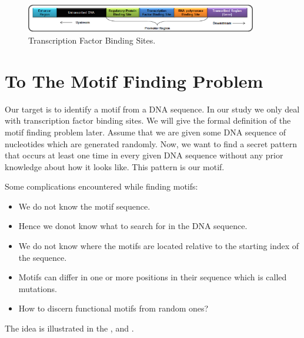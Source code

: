 \begin{figure}[!tb]
	\centering
	\includegraphics[width=0.9\textwidth]{figures/tfbs}
	\caption{Transcription Factor Binding Sites.}
	\label{fig:tfbs}
\end{figure}

\section{To The Motif Finding Problem}
Our target is to identify a motif from a DNA sequence. In our study
we only deal with transcription factor binding sites. We will give
the formal definition of the motif finding problem later. Assume
that we are given some DNA sequence of nucleotides which are generated
randomly. Now, we want to find a secret pattern that occurs at least
one time in every given DNA sequence without any prior knowledge
about how it looks like. This pattern is our motif.

Some complications encountered while finding motifs:
\begin{itemize}
	\item We do not know the motif sequence.
	\item Hence we donot know what to search for in the DNA sequence.
	\item We do not know where the motifs are located relative to
	the starting index of the sequence.
	\item Motifs can differ in one or more positions in their
	sequence which is called mutations.
	\item How to discern functional motifs from random ones?
	
\end{itemize}

The idea is illustrated in the , 
and .

